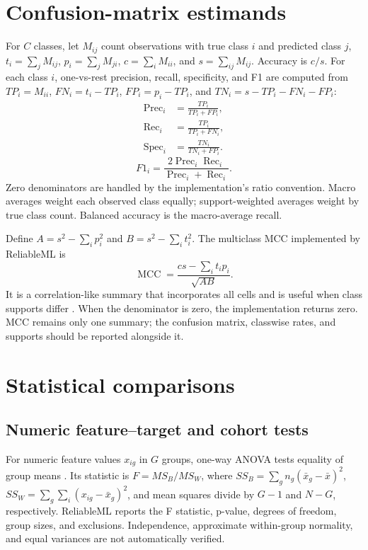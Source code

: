 \documentclass[conference]{IEEEtran}
\begin{document}
\section{Confusion-matrix estimands}
For \(C\) classes, let \(M_{ij}\) count observations with true class \(i\) and predicted class \(j\), \(t_i=\sum_j M_{ij}\), \(p_i=\sum_j M_{ji}\), \(c=\sum_i M_{ii}\), and \(s=\sum_{ij}M_{ij}\). Accuracy is \(c/s\). For each class \(i\), one-vs-rest precision, recall, specificity, and F1 are computed from \(TP_i=M_{ii}\), \(FN_i=t_i-TP_i\), \(FP_i=p_i-TP_i\), and \(TN_i=s-TP_i-FN_i-FP_i\):
\[
\begin{aligned}
\operatorname{Prec}_i&=\frac{TP_i}{TP_i+FP_i},\\
\operatorname{Rec}_i&=\frac{TP_i}{TP_i+FN_i},\\
\operatorname{Spec}_i&=\frac{TN_i}{TN_i+FP_i}.
\end{aligned}
\]
\[
F1_i=\frac{2\operatorname{Prec}_i\operatorname{Rec}_i}
{\operatorname{Prec}_i+\operatorname{Rec}_i}.
\]
Zero denominators are handled by the implementation's ratio convention. Macro averages weight each observed class equally; support-weighted averages weight by true class count. Balanced accuracy is the macro-average recall.

Define \(A=s^2-\sum_i p_i^2\) and \(B=s^2-\sum_i t_i^2\). The multiclass MCC implemented by ReliableML \cite{software} is
\[
\operatorname{MCC}=\frac{cs-\sum_i t_ip_i}{\sqrt{AB}}.
\]
It is a correlation-like summary that incorporates all cells and is useful when class supports differ \cite{gorodkin2004,matthews1975}. When the denominator is zero, the implementation returns zero. MCC remains only one summary; the confusion matrix, classwise rates, and supports should be reported alongside it.

\section{Statistical comparisons}
\subsection{Numeric feature--target and cohort tests}
For numeric feature values \(x_{ig}\) in \(G\) groups, one-way ANOVA tests equality of group means \cite{fisher1925}. Its statistic is \(F=MS_B/MS_W\), where \(SS_B=\sum_g n_g(\bar x_g-\bar x)^2\), \(SS_W=\sum_g\sum_i(x_{ig}-\bar x_g)^2\), and mean squares divide by \(G-1\) and \(N-G\), respectively. ReliableML reports the F statistic, p-value, degrees of freedom, group sizes, and exclusions. Independence, approximate within-group normality, and equal variances are not automatically verified.
\end{document}
